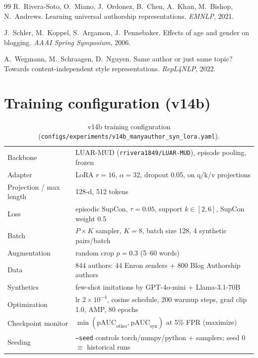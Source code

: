 \documentclass[11pt]{article}
\newcommand{\vbest}{v14b}
\begin{document}
\begin{thebibliography}{99}
R.~Rivera-Soto, O.~Miano, J.~Ordonez, B.~Chen, A.~Khan, M.~Bishop, N.~Andrews.
\newblock Learning universal authorship representations.
\newblock \emph{EMNLP}, 2021.

J.~Schler, M.~Koppel, S.~Argamon, J.~Pennebaker.
\newblock Effects of age and gender on blogging.
\newblock \emph{AAAI Spring Symposium}, 2006.

A.~Wegmann, M.~Schraagen, D.~Nguyen.
\newblock Same author or just same topic? Towards content-independent style representations.
\newblock \emph{RepL4NLP}, 2022.

\end{thebibliography}

\appendix

\section{Training configuration (\vbest{})}
\label{app:config}

\begin{table}[H]
\centering
\small
\setlength{\tabcolsep}{4pt}
\begin{tabular}{ll}
\toprule
Backbone & LUAR-MUD (\texttt{rrivera1849/LUAR-MUD}), episode pooling, frozen \\
Adapter & LoRA $r{=}16$, $\alpha{=}32$, dropout 0.05, on q/k/v projections \\
Projection / max length & 128-d, 512 tokens \\
Loss & episodic SupCon, $\tau{=}0.05$, support $k \in [2,6]$, SupCon weight 0.5 \\
Batch & $P{\times}K$ sampler, $K{=}8$, batch size 128, 4 synthetic pairs/batch \\
Augmentation & random crop $p{=}0.3$ (5--60 words) \\
Data & 844 authors: 44 Enron senders + 800 Blog Authorship authors \\
Synthetics & few-shot imitations by GPT-4o-mini + Llama-3.1-70B \\
Optimization & lr $2{\times}10^{-4}$, cosine schedule, 200 warmup steps, grad clip 1.0, AMP, 80 epochs \\
Checkpoint monitor & $\min(\text{pAUC}_{\mathrm{other}}, \text{pAUC}_{\mathrm{syn}})$ at 5\% FPR (maximize) \\
Seeding & \texttt{--seed} controls torch/numpy/python + samplers; seed 0 $\equiv$ historical runs \\
\bottomrule
\end{tabular}
\caption{\vbest{} training configuration
(\texttt{configs/experiments/v14b\_manyauthor\_syn\_lora.yaml}).}
\end{table}
\end{document}
